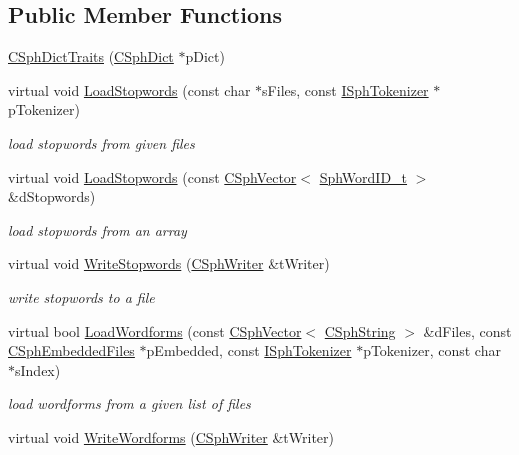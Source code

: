 \subsection*{Public Member Functions}
\begin{DoxyCompactItemize}
\item 
\hyperlink{classCSphDictTraits_a412c6042a82196a7a5f361e4d0d9e8da}{C\-Sph\-Dict\-Traits} (\hyperlink{classCSphDict}{C\-Sph\-Dict} $\ast$p\-Dict)
\item 
virtual void \hyperlink{classCSphDictTraits_a13bd9a6321c97a4c2d644cf99a7a2181}{Load\-Stopwords} (const char $\ast$s\-Files, const \hyperlink{classISphTokenizer}{I\-Sph\-Tokenizer} $\ast$p\-Tokenizer)
\begin{DoxyCompactList}\small\item\em load stopwords from given files \end{DoxyCompactList}\item 
virtual void \hyperlink{classCSphDictTraits_a335f1657e24b6d44e45cceb514dfcb07}{Load\-Stopwords} (const \hyperlink{classCSphVector}{C\-Sph\-Vector}$<$ \hyperlink{sphinx_8h_a80a94d5984fdf9214a98f3e5e65df963}{Sph\-Word\-I\-D\-\_\-t} $>$ \&d\-Stopwords)
\begin{DoxyCompactList}\small\item\em load stopwords from an array \end{DoxyCompactList}\item 
virtual void \hyperlink{classCSphDictTraits_a1f3c58b5e90f1e82619529e21d0a8ce2}{Write\-Stopwords} (\hyperlink{classCSphWriter}{C\-Sph\-Writer} \&t\-Writer)
\begin{DoxyCompactList}\small\item\em write stopwords to a file \end{DoxyCompactList}\item 
virtual bool \hyperlink{classCSphDictTraits_adc8d162550f47fb5b09606294dd480c6}{Load\-Wordforms} (const \hyperlink{classCSphVector}{C\-Sph\-Vector}$<$ \hyperlink{structCSphString}{C\-Sph\-String} $>$ \&d\-Files, const \hyperlink{structCSphEmbeddedFiles}{C\-Sph\-Embedded\-Files} $\ast$p\-Embedded, const \hyperlink{classISphTokenizer}{I\-Sph\-Tokenizer} $\ast$p\-Tokenizer, const char $\ast$s\-Index)
\begin{DoxyCompactList}\small\item\em load wordforms from a given list of files \end{DoxyCompactList}\item 
virtual void \hyperlink{classCSphDictTraits_a0659ebe6ea5a3c0a56e21018f0e7f775}{Write\-Wordforms} (\hyperlink{classCSphWriter}{C\-Sph\-Writer} \&t\-Writer)

\end{DoxyCompactItemize}
